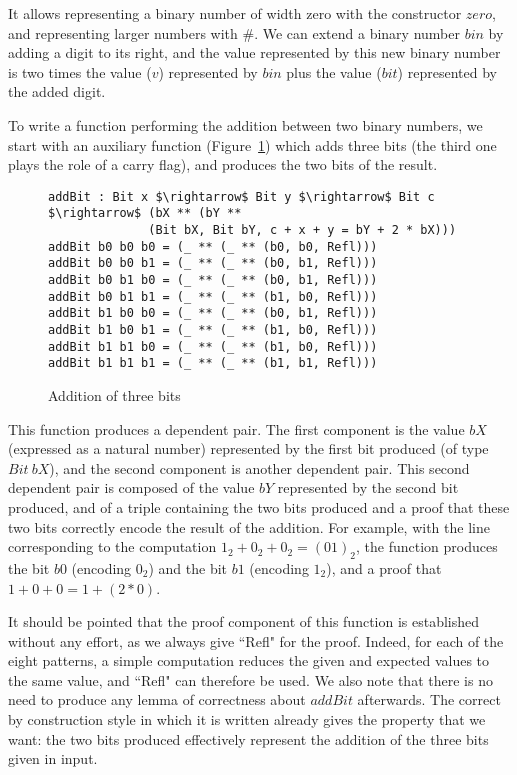 It allows representing a
binary number of width zero with the constructor $zero$, 
and representing larger numbers with $\#$.
We
can extend a binary number $bin$ by adding a digit to its right, and the value
represented by this new binary number is two times the value ($v$) represented
by $bin$ plus the value ($bit$) represented by the added digit.

To write a function performing the addition between two binary numbers,
we start with an auxiliary function (Figure~\ref{addbit}) which adds three bits
(the third one plays the role of a carry flag), and produces the two bits of
the result.

\begin{figure}[H]
\figrule
\begin{center}
\begin{lstlisting}
addBit : Bit x $\rightarrow$ Bit y $\rightarrow$ Bit c $\rightarrow$ (bX ** (bY ** 
              (Bit bX, Bit bY, c + x + y = bY + 2 * bX)))
addBit b0 b0 b0 = (_ ** (_ ** (b0, b0, Refl)))
addBit b0 b0 b1 = (_ ** (_ ** (b0, b1, Refl)))
addBit b0 b1 b0 = (_ ** (_ ** (b0, b1, Refl)))
addBit b0 b1 b1 = (_ ** (_ ** (b1, b0, Refl)))
addBit b1 b0 b0 = (_ ** (_ ** (b0, b1, Refl)))
addBit b1 b0 b1 = (_ ** (_ ** (b1, b0, Refl)))
addBit b1 b1 b0 = (_ ** (_ ** (b1, b0, Refl)))
addBit b1 b1 b1 = (_ ** (_ ** (b1, b1, Refl)))
\end{lstlisting}
\end{center}
\caption{Addition of three bits}
\label{addbit}
\figrule
\end{figure}

This function produces a dependent pair. The first component is the value $bX$
(expressed as a natural number) represented by the first bit produced (of type
$Bit\ bX$), and the second component is another dependent pair. This
second dependent pair is composed of the value $bY$ represented by the second
bit produced, and of a triple containing the two bits produced and a
proof that these two bits correctly encode the result of the addition.
For example, with the line corresponding to the computation
$1_2 + 0_2 + 0_2 = (01)_2$, the function produces the bit $b0$ (encoding $0_2$)
and the bit $b1$ (encoding $1_2$), and a proof that $1 + 0 + 0 = 1 + (2*0)$.

It should be pointed that the proof component of this function is established without any effort, as we always give ``Refl" for the proof. Indeed, for each of the eight patterns, a simple computation reduces the given and expected values to the same value, and ``Refl" can therefore be used. We also note that
there is no need to produce any lemma of correctness about $addBit$ afterwards.
The correct by construction style in which it is written already gives the
property that we want: the two bits produced effectively represent the
addition of the three bits given in input.

